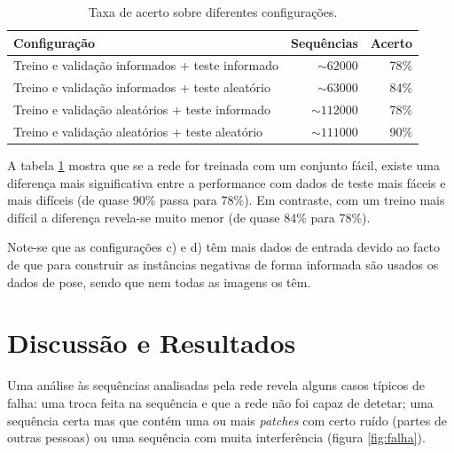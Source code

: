 \begin{table} [!htbp]
\centering
\begin{tabular}{|l|r|r|}
\hline
\textbf{Configuração} & \textbf{Sequências} & \textbf{Acerto}\\
\hline
\hline
Treino e validação informados + teste informado & $\sim62000$ & 78\% \\
\hline
Treino e validação informados + teste aleatório & $\sim63000$ & 84\% \\
\hline
Treino e validação aleatórios + teste informado & $\sim112000$ & 78\% \\
\hline
Treino e validação aleatórios + teste aleatório & $\sim111000$ & 90\% \\
\hline
\end{tabular}
\caption{Taxa de acerto sobre diferentes configurações.}
\label{tab:resultados}
\end{table}

\noindent A tabela \ref{tab:resultados} mostra que se a rede for treinada com um conjunto fácil, existe uma diferença mais significativa entre a performance com dados de teste mais fáceis e mais difíceis (de quase 90\% passa para 78\%). Em contraste, com um treino mais difícil a diferença revela-se muito menor (de quase 84\% para 78\%).


\noindent Note-se que as configurações c) e d) têm mais dados de entrada devido ao facto de que para construir as instâncias negativas de forma informada são usados os dados de pose, sendo que nem todas as imagens os têm.

\section{Discussão e Resultados}
\label{chap3:sec:final}
Uma análise às sequências analisadas pela rede revela alguns casos típicos de falha: uma troca feita na sequência e que a rede não foi capaz de detetar; uma sequência certa mas que contém uma ou mais \textit{patches} com certo ruído (partes de outras pessoas) ou uma sequência com muita interferência (figura \ref{fig:falha}).

